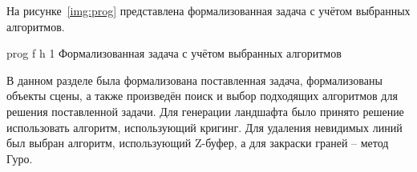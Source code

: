На рисунке~\ref{img:prog} представлена формализованная задача с учётом выбранных алгоритмов.

\FloatBarrier
{}
{prog} %
{f} %
{h} %
{1\textwidth} %
{Формализованная задача с учётом выбранных алгоритмов} %
\FloatBarrier


В данном разделе была формализована поставленная задача, формализованы объекты сцены, а также произведён поиск и выбор подходящих алгоритмов для решения поставленной задачи. Для генерации ландшафта было принято решение использовать алгоритм, использующий кригинг. Для удаления невидимых линий был выбран алгоритм, использующий Z-буфер, а для закраски граней -- метод Гуро.